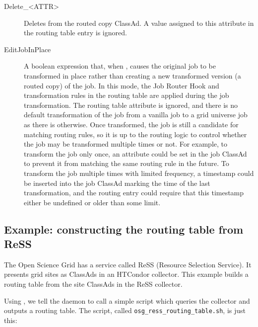 \begin{description}
\item[Delete\_<ATTR>] Deletes  from the routed copy
ClassAd.  A value assigned to this attribute in the routing table
entry is ignored.

\item[EditJobInPlace] A boolean expression that, when ,
causes the original job to be transformed in place rather than creating a new
transformed version (a routed copy) of the job.  
In this mode, the Job Router Hook
 and transformation
rules in the routing table are applied during the job
transformation.  The routing table attribute  is
ignored, and there is no default transformation of the job from a
vanilla job to a grid universe job as there is otherwise.  Once
transformed, the job is still a candidate for matching routing rules,
so it is up to the routing logic to control whether the job may be
transformed multiple times or not.  For example, to transform the job
only once, an attribute could be set in the job ClassAd to prevent it from
matching the same routing rule in the future.  To transform the job
multiple times with limited frequency, a timestamp could be inserted
into the job ClassAd marking the time of the last transformation, and the
routing entry could require that this timestamp either be undefined
or older than some limit.

\end{description}

\subsection{\label{JobRouterReSSExample}Example: constructing the routing table from ReSS}

The Open Science Grid has a service called ReSS (Resource Selection
Service).  It presents grid sites as ClassAds in an HTCondor collector.
This example builds a routing table from the site ClassAds in the ReSS
collector.

Using , we tell the  daemon to call a
simple script which queries the collector and outputs a routing table.
The script, called \verb|osg_ress_routing_table.sh|, is just this:

